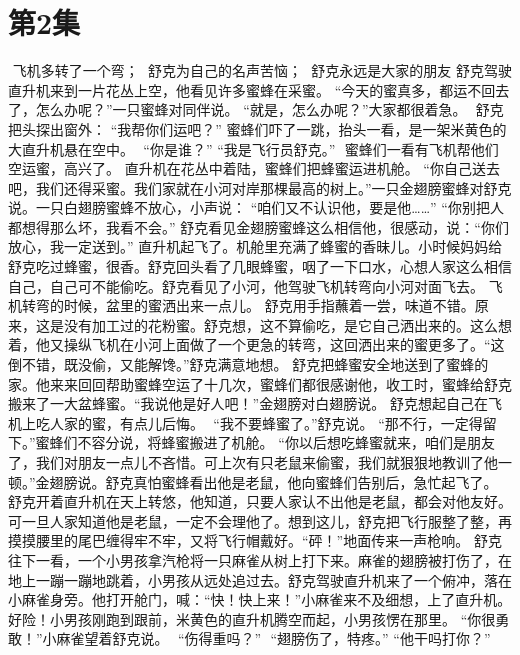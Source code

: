 \documentclass[a4paper,12pt,UTF8,twoside]{ctexbook}
\begin{document}
\chapter{第2集}
 
​    飞机多转了一个弯； 
​    舒克为自己的名声苦恼； 
​    舒克永远是大家的朋友   
​    舒克驾驶直升机来到一片花丛上空，他看见许多蜜蜂在采蜜。 
​    “今天的蜜真多，都运不回去了，怎么办呢？”一只蜜蜂对同伴说。 
​    “就是，怎么办呢？”大家都很着急。 
​    舒克把头探出窗外：  “我帮你们运吧？” 
​    蜜蜂们吓了一跳，抬头一看，是一架米黄色的大直升机悬在空中。 
​    “你是谁？” 
​    “我是飞行员舒克。” 
​    蜜蜂们一看有飞机帮他们空运蜜，高兴了。 
​    直升机在花丛中着陆，蜜蜂们把蜂蜜运进机舱。 
​    “你自己送去吧，我们还得采蜜。我们家就在小河对岸那棵最高的树上。”一只金翅膀蜜蜂对舒克说。 
​    一只白翅膀蜜蜂不放心，小声说：  “咱们又不认识他，要是他……” 
​    “你别把人都想得那么坏，我看不会。” 
​    舒克看见金翅膀蜜蜂这么相信他，很感动，说：“你们放心，我一定送到。” 
​    直升机起飞了。机舱里充满了蜂蜜的香昧儿。小时候妈妈给舒克吃过蜂蜜，很香。舒克回头看了几眼蜂蜜，咽了一下口水，心想人家这么相信自己，自己可不能偷吃。 
​    舒克看见了小河，他驾驶飞机转弯向小河对面飞去。 
​    飞机转弯的时候，盆里的蜜洒出来一点儿。 
​    舒克用手指蘸着一尝，味道不错。原来，这是没有加工过的花粉蜜。舒克想，这不算偷吃，是它自己洒出来的。这么想着，他又操纵飞机在小河上面做了一个更急的转弯，这回洒出来的蜜更多了。 
​    “这倒不错，既没偷，又能解馋。”舒克满意地想。 
​    舒克把蜂蜜安全地送到了蜜蜂的家。他来来回回帮助蜜蜂空运了十几次，蜜蜂们都很感谢他，收工时，蜜蜂给舒克搬来了一大盆蜂蜜。 
​    “我说他是好人吧！”金翅膀对白翅膀说。 
​    舒克想起自己在飞机上吃人家的蜜，有点儿后悔。 
​    “我不要蜂蜜了。”舒克说。 
​    “那不行，一定得留下。”蜜蜂们不容分说，将蜂蜜搬进了机舱。 
​    “你以后想吃蜂蜜就来，咱们是朋友了，我们对朋友一点儿不吝惜。可上次有只老鼠来偷蜜，我们就狠狠地教训了他一顿。”金翅膀说。 
​    舒克真怕蜜蜂看出他是老鼠，他向蜜蜂们告别后，急忙起飞了。 
​    舒克开着直升机在天上转悠，他知道，只要人家认不出他是老鼠，都会对他友好。可一旦人家知道他是老鼠，一定不会理他了。想到这儿，舒克把飞行服整了整，再摸摸腰里的尾巴缠得牢不牢，又将飞行帽戴好。 
​    “砰！”地面传来一声枪响。 
​    舒克往下一看，一个小男孩拿汽枪将一只麻雀从树上打下来。麻雀的翅膀被打伤了，在地上一蹦一蹦地跳着，小男孩从远处追过去。 
​    舒克驾驶直升机来了一个俯冲，落在小麻雀身旁。他打开舱门，喊：“快！快上来！” 
​    小麻雀来不及细想，上了直升机。 
​    好险！小男孩刚跑到跟前，米黄色的直升机腾空而起，小男孩愣在那里。 
​    “你很勇敢！”小麻雀望着舒克说。 
​    “伤得重吗？” 
​    “翅膀伤了，特疼。” 
​    “他干吗打你？” 
\end{document}
